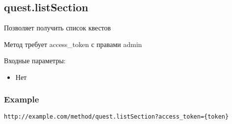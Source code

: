 \subsection{quest.listSection}

Позволяет получить список квестов

Метод требует access\_token с правами admin

Входные параметры:
\begin{itemize}
	\item Нет
\end{itemize}

\subsubsection{Example}
\begin{Verbatim}[frame=single]
http://example.com/method/quest.listSection?access_token={token}
\end{Verbatim}
